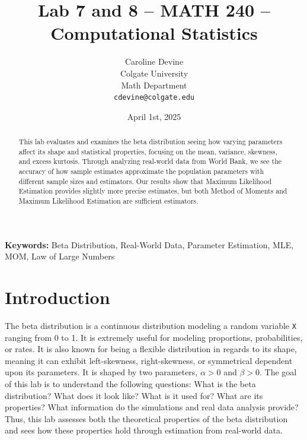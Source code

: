 \documentclass{article}\usepackage[]{graphicx}\usepackage[]{xcolor}
\begin{document}
\vspace{-1in}
\title{Lab 7 and 8 -- MATH 240 -- Computational Statistics}

\author{
  Caroline Devine \\
  Colgate University  \\
  Math Department  \\
  {\tt cdevine@colgate.edu}
}

\date{April 1st, 2025}

\maketitle

\begin{multicols}{2}
\begin{abstract}
This lab evaluates and examines the beta distribution seeing how varying parameters affect its shape and statistical properties, focusing on the mean, variance, skewness, and excess kurtosis. Through analyzing real-world data from World Bank, we see the accuracy of how sample estimates approximate the population parameters with different sample sizes and estimators. Our results show that Maximum Likelihood Estimation provides slightly more precise estimates, but both Method of Moments and Maximum Likelihood Estimation are sufficient estimators. 
\end{abstract}

\noindent \textbf{Keywords:} Beta Distribution, Real-World Data, Parameter Estimation, MLE, MOM, Law of Large Numbers

\section{Introduction}

The beta distribution is a continuous distribution modeling a random variable \texttt{X} ranging from 0 to 1. It is extremely useful for modeling proportions, probabilities, or rates. It is also known for being a flexible distribution in regards to its shape, meaning it can exhibit left-skewness, right-skewness, or symmetrical dependent upon its parameters. It is shaped by two parameters, \(\alpha\)\(>\)0 and \(\beta\)\(>\)0. The goal of this lab is to understand the following questions: What is the beta distribution? What does it look like? What is it used for? What are its properties? What information do the simulations and real data analysis provide? Thus, this lab assesses both the theoretical properties of the beta distribution and sees how these properties hold through estimation from real-world data. 


\end{multicols}
\end{document}
